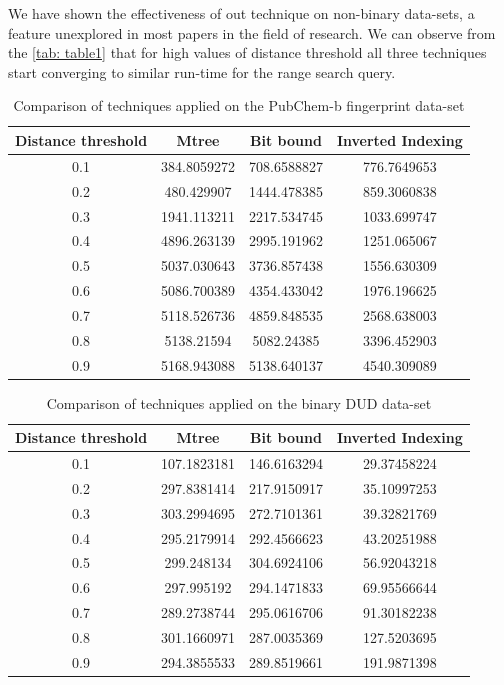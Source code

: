 We have shown the effectiveness of out technique on non-binary data-sets, a feature unexplored in most papers in the field of research. We can observe from the \autoref{tab: table1} that for high values of distance threshold all three techniques start converging to similar run-time for the range search query. \\

\begin{table}[ht!]
\centering
\caption{Comparison of techniques applied on the PubChem-b fingerprint data-set}
\label{tab: table2}
\begin{tabular}{|c|c|c|c|}
\hline 
Distance threshold & Mtree	& Bit bound	& 	Inverted Indexing \\
\hline
0.1 & 384.8059272 	&	708.6588827 	&	776.7649653\\
0.2 & 480.429907	  	&  	1444.478385	&	859.3060838\\
0.3 & 1941.113211 	&	2217.534745 	&	1033.699747\\
0.4	& 4896.263139 	&	2995.191962 	&	1251.065067\\
0.5	& 5037.030643 	&	3736.857438 	&	1556.630309\\
0.6	& 5086.700389 	&	4354.433042 	&	1976.196625\\
0.7	& 5118.526736 	&	4859.848535 	&	2568.638003\\
0.8	& 5138.21594	 	& 	5082.24385 	&	3396.452903\\
0.9	& 5168.943088	&	5138.640137 	&	4540.309089\\
\hline 
\end{tabular} 
\end{table}




\begin{table}[ht!]
\centering
\caption{Comparison of techniques applied on the binary DUD data-set}
\label{tab: table3}
\begin{tabular}{|c|c|c|c|}
\hline 
Distance threshold & Mtree	& Bit bound	& 	Inverted Indexing \\
\hline
0.1 	& 107.1823181	& 146.6163294	& 	29.37458224\\
0.2 & 297.8381414	& 217.9150917	& 	35.10997253	\\
0.3 & 303.2994695	& 272.7101361	& 	39.32821769	\\
0.4 & 295.2179914	& 292.4566623	& 	43.20251988	\\
0.5 & 299.248134 	& 304.6924106	& 	56.92043218	\\
0.6 & 297.995192 	& 294.1471833	& 	69.95566644	\\
0.7 & 289.2738744	& 295.0616706	& 	91.30182238	\\
0.8	& 301.1660971	& 287.0035369	& 	127.5203695	\\
0.9 & 294.3855533	& 289.8519661	& 	191.9871398	\\
\hline 
\end{tabular} 
\end{table}



